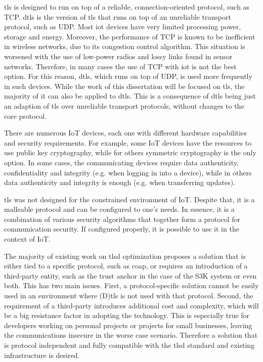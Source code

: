 \documentclass{llncs}
\begin{document}
\gls{tls} is designed to run on top of a reliable, connection-oriented
protocol, such as TCP. \gls{dtls} is the version of \gls{tls} that runs on top
of an unreliable transport protocol, such as UDP. Most \gls{iot} devices have
very limited processing power, storage and energy. Moreover, the performance of
TCP is known to be inefficient in wireless networks, due to its congestion control
algorithm. This situation is worsened with the use of low-power radios and lossy
links found in sensor networks. Therefore, in many cases the use of TCP with \gls{iot}
is not the best option. For this reason, \gls{dtls}, which runs on top
of UDP, is used more frequently in such devices. 
While the work of this dissertation will be focused on \gls{tls}, the majority of it
can also be applied to \gls{dtls}. This is a consequence of \gls{dtls} being 
just an adaption of \gls{tls} over unreliable  transport protocols, 
without changes to the core protocol.

There are numerous IoT devices, each one with different hardware
capabilities and security requirements. For example, some IoT
devices have the resources to use public key cryptography,
while for others symmetric cryptography is the only option.
In some cases, the communicating devices require data authenticity, confidentiality
and integrity (e.g. when logging in into a device), while in others data
authenticity and integrity is enough (e.g. when transferring updates).

\gls{tls} was not designed for the constrained environment of IoT. Despite that,
it is a malleable protocol and can be configured to one's needs. In essence,
it is a combination of various security algorithms that together form
a protocol for communication security. If configured
properly, it is possible to use it in the context of IoT.

The majority of existing work on \gls{tlsd} optimization proposes 
a solution that is either tied to a
specific protocol, such as \gls{coap}, or requires an introduction of a third-party
entity, such as the trust anchor in the case of the S3K system\cite{S3KScala62:online} or
even both. This has two main issues. First, a protocol-specific solution cannot
be easily used in an environment where (D)\gls{tls} is not used with that protocol.
Second, the requirement of a third-party
introduces additional cost and complexity, which will be a big resistance factor
in adopting the technology. This is especially true for developers working on
personal projects or projects for small businesses, leaving the communications insecure
in the worse case scenario. Therefore a solution that is protocol independent and fully 
compatible with the \gls{tlsd} standard and existing infrastructure is desired.
\end{document}
